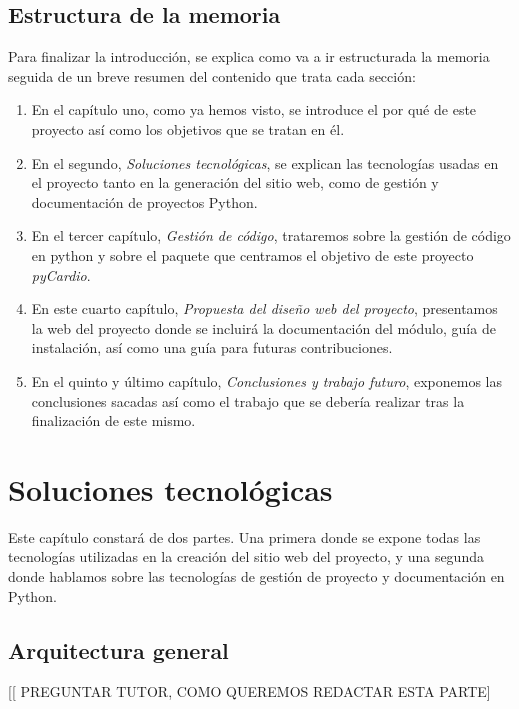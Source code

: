 \documentclass[a4paper, 12pt]{book}
\begin{document}
\section{Estructura de la memoria}
\label{sec:estruc}
Para finalizar la introducción, se explica como va a ir estructurada la memoria seguida de un breve resumen del contenido que trata cada sección: 
\begin{enumerate}
    \item En el capítulo uno, como ya hemos visto, se introduce el por qué de este proyecto así como los objetivos que se tratan en él.
    \item En el segundo, \emph{Soluciones tecnológicas}, se explican las tecnologías usadas en el proyecto tanto en la generación del sitio web, como de gestión y documentación de proyectos Python.
    \item En el tercer capítulo, \emph{Gestión de código}, trataremos sobre la gestión de código en python y sobre el paquete que centramos el objetivo de este proyecto \emph{pyCardio}.
    \item En este cuarto capítulo, \emph{Propuesta del diseño web del proyecto}, presentamos la web del proyecto donde se incluirá la documentación del módulo, guía de instalación, así como una guía para futuras contribuciones.
    \item En el quinto y último capítulo, \emph{Conclusiones y trabajo futuro}, exponemos las conclusiones sacadas así como el trabajo que se debería realizar tras la finalización de este mismo.
\end{enumerate}

\chapter{Soluciones tecnológicas}
\label{chap:Arqui}
Este capítulo constará de dos partes. Una primera donde se expone todas las tecnologías utilizadas en la creación del sitio web del proyecto, y una segunda donde hablamos sobre las tecnologías de gestión de proyecto y documentación en Python.

\section{Arquitectura general}
\label{sec:arqui}
[[  PREGUNTAR TUTOR, COMO QUEREMOS REDACTAR ESTA PARTE]
\end{document}
